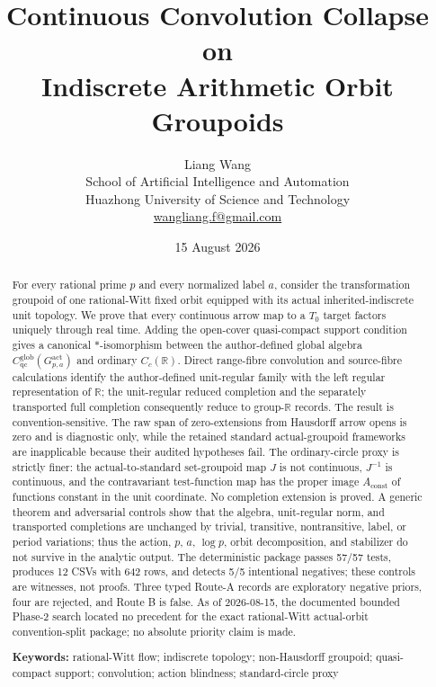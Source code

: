 \documentclass[11pt]{article}
\title{\textbf{Continuous Convolution Collapse on\\Indiscrete Arithmetic Orbit Groupoids}}
\author{Liang Wang\\
\small School of Artificial Intelligence and Automation\\
\small Huazhong University of Science and Technology\\
\small \href{mailto:wangliang.f@gmail.com}{wangliang.f@gmail.com}}
\date{15 August 2026}
\theoremstyle{definition}
\newcommand{\R}{\mathbb R}
\newcommand{\Gact}{G_{p,a}^{\mathrm{act}}}
\newcommand{\Cglob}{C_{\mathrm{qc}}^{\mathrm{glob}}}
\newcommand{\Aconst}{A_{\mathrm{const}}}
\begin{document}
\maketitle

\begin{abstract}
For every rational prime $p$ and every normalized label $a$, consider the
transformation groupoid of one rational-Witt fixed orbit equipped with its
actual inherited-indiscrete unit topology.  We prove that every continuous
arrow map to a $T_0$ target factors uniquely through real time.  Adding the
open-cover quasi-compact support condition gives a canonical $*$-isomorphism
between the author-defined global algebra $\Cglob(\Gact)$ and ordinary
$C_c(\R)$.  Direct range-fibre convolution and source-fibre calculations
identify the author-defined unit-regular family with the left regular
representation of $\R$; the unit-regular reduced completion and the
separately transported full completion consequently reduce to group-$\R$
records.  The result is
convention-sensitive.  The raw span of zero-extensions from Hausdorff arrow
opens is zero and is diagnostic only, while the retained standard
actual-groupoid frameworks are inapplicable because their audited hypotheses
fail.  The ordinary-circle proxy is strictly finer: the actual-to-standard
set-groupoid map $J$ is not continuous, $J^{-1}$ is continuous, and the
contravariant test-function map has the proper image $\Aconst$ of functions
constant in the unit coordinate.  No completion extension is proved.  A
generic theorem and adversarial controls show that the algebra, unit-regular
norm, and transported completions are unchanged by trivial, transitive,
nontransitive, label, or period variations; thus the action, $p$, $a$,
$\log p$, orbit decomposition, and stabilizer do not survive in the analytic
output.  The deterministic package passes 57/57 tests, produces 12 CSVs with
642 rows, and detects 5/5 intentional negatives; these controls are witnesses,
not proofs.  Three typed Route-A records are exploratory negative priors, four
are rejected, and Route B is false.  As of 2026-08-15, the documented bounded
Phase-2 search located no precedent for the exact rational-Witt actual-orbit
convention-split package; no absolute priority claim is made.

\medskip
\noindent\textbf{Keywords:} rational-Witt flow; indiscrete topology;
non-Hausdorff groupoid; quasi-compact support; convolution; action blindness;
standard-circle proxy
\end{abstract}
\end{document}
